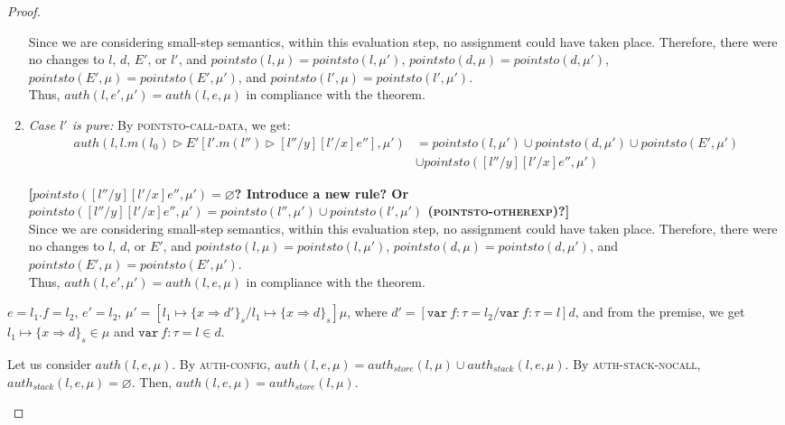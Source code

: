 \documentclass{llncs}
\newcommand{\keywadj}[1]{\mathtt{#1}}
\newcommand{\keyw}[1]{\keywadj{#1}~}
\newcommand{\todo}[1]{\textbf{[#1]}}
\newcommand{\pcase}[1][]{
  \if\relax\detokenize{#1}\relax
    \def\thiscase{}
  \else
    \def\thiscase{~#1}
  \fi
  \item
}
\begin{document}
\begin{proof}
\begin{pcases}
\begin{enumerate}
Since we are considering small-step semantics, within this evaluation step, no assignment could have taken place. Therefore, there were no changes to $l$, $d$, $E'$, or $l'$, and $pointsto(l, \mu) = pointsto(l, \mu')$, $pointsto(d, \mu) = pointsto(d, \mu')$, $pointsto(E', \mu) = pointsto(E', \mu')$, and $pointsto(l', \mu) = pointsto(l', \mu')$.\\

Thus, $auth(l, e', \mu') = auth(l, e, \mu)$ in compliance with the theorem.
\\

\item[] \textit{Case $l'$ is pure:} By \textsc{pointsto-call-data}, we get:
\begin{align*}
auth(l, l.m(l_0) \rhd E'[l'.m(l'') \rhd [l''/y] [l'/x] e''], \mu') &= pointsto(l, \mu') \cup pointsto(d, \mu') \cup pointsto(E', \mu') \\
&\cup pointsto([l''/y] [l'/x] e'', \mu')
\end{align*}

\todo{$pointsto([l''/y] [l'/x] e'', \mu') = \varnothing$? Introduce a new rule? Or $pointsto([l''/y] [l'/x] e'', \mu') = pointsto(l'', \mu') \cup pointsto(l', \mu')$ (\textsc{pointsto-otherexp})?}\\

Since we are considering small-step semantics, within this evaluation step, no assignment could have taken place. Therefore, there were no changes to $l$, $d$, or $E'$, and $pointsto(l, \mu) = pointsto(l, \mu')$, $pointsto(d, \mu) = pointsto(d, \mu')$, and $pointsto(E', \mu) = pointsto(E', \mu')$.\\

Thus, $auth(l, e', \mu') = auth(l, e, \mu)$ in compliance with the theorem.
\\
\end{enumerate}

\pcase[\textsc{E-Assign}]
$e = l_1.f = l_2$, $e' = l_2$, $\mu' = [l_1 \mapsto \{ x \Rightarrow d' \}_{s}/l_1 \mapsto \{ x \Rightarrow d \}_{s}]\mu$, where $d' = [\keyw{var} f:\tau = l_2/\keyw{var} f:\tau = l]d$, and from the premise, we get $l_1 \mapsto \{ x \Rightarrow d \}_{s} \in \mu$ and $\keyw{var} f:\tau = l \in d$.

\hspace{12pt} Let us consider $auth(l, e, \mu)$. By \textsc{auth-config}, $auth(l, e, \mu) = auth_{store}(l, \mu) \cup auth_{stack}(l,e,\mu)$. By \textsc{auth-stack-nocall}, $auth_{stack}(l, e, \mu) = \varnothing$. Then, $auth(l, e, \mu) = auth_{store}(l, \mu)$.


\end{pcases}
\end{proof}
\end{document}
